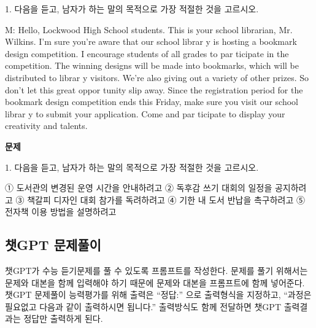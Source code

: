 \documentclass[
  letterpaper,
]{book}
\newenvironment{Shaded}{\begin{snugshade}}{\end{snugshade}}
\newcommand{\NormalTok}[1]{\textcolor[rgb]{0.00,0.23,0.31}{#1}}
\begin{document}
\begin{Shaded}
\begin{Highlighting}[]
\NormalTok{1. 다음을 듣고, 남자가 하는 말의 목적으로 가장 적절한 것을 고르시오.}

\NormalTok{M: Hello, Lockwood High School students. This is your school librarian, Mr. Wilkins. I’m sure you’re aware that our school librar y is hosting a bookmark design competition. I encourage students of all grades to par ticipate in the competition. The winning designs will be made into bookmarks, which will be distributed to librar y visitors. We’re also giving out a variety of other prizes. So don’t let this great oppor tunity slip away. Since the registration period for the bookmark design competition ends this Friday, make sure you visit our school librar y to submit your application. Come and par ticipate to display your creativity and talents.}
\end{Highlighting}
\end{Shaded}

\textbf{문제}

\begin{Shaded}
\begin{Highlighting}[]
\NormalTok{1. 다음을 듣고, 남자가 하는 말의 목적으로 가장 적절한 것을 고르시오.}

\NormalTok{① 도서관의 변경된 운영 시간을 안내하려고 }
\NormalTok{② 독후감 쓰기 대회의 일정을 공지하려고 }
\NormalTok{③ 책갈피 디자인 대회 참가를 독려하려고 }
\NormalTok{④ 기한 내 도서 반납을 촉구하려고 }
\NormalTok{⑤ 전자책 이용 방법을 설명하려고}
\end{Highlighting}
\end{Shaded}

\hypertarget{uxcc57gpt-uxbb38uxc81cuxd480uxc774}{%
\subsection{챗GPT 문제풀이}\label{uxcc57gpt-uxbb38uxc81cuxd480uxc774}}

챗GPT가 수능 듣기문제를 풀 수 있도록 프롬프트를 작성한다. 문제를 풀기
위해서는 문제와 대본을 함께 입력해야 하기 때문에 문제와 대본을
프롬프트에 함께 넣어준다. 챗GPT 문제풀이 능력평가를 위해 출력은
``정답:'' 으로 출력형식을 지정하고, ``과정은 필요없고 다음과 같이
출력하시면 됩니다.'' 출력방식도 함께 전달하면 챗GPT 출력결과는 정답만
출력하게 된다.
\end{document}
